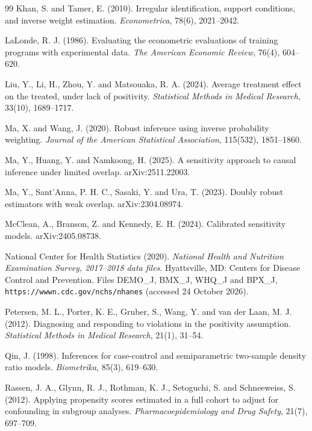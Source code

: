 \begin{thebibliography}{99}
 Khan, S. and Tamer, E. (2010). Irregular identification, support conditions, and inverse weight estimation. \emph{Econometrica}, 78(6), 2021--2042.

 LaLonde, R. J. (1986). Evaluating the econometric evaluations of training programs with experimental data. \emph{The American Economic Review}, 76(4), 604--620.

 Liu, Y., Li, H., Zhou, Y. and Matsouaka, R. A. (2024). Average treatment effect on the treated, under lack of positivity. \emph{Statistical Methods in Medical Research}, 33(10), 1689--1717.

 Ma, X. and Wang, J. (2020). Robust inference using inverse probability weighting. \emph{Journal of the American Statistical Association}, 115(532), 1851--1860.

 Ma, Y., Huang, Y. and Namkoong, H. (2025). A sensitivity approach to causal inference under limited overlap. arXiv:2511.22003.

 Ma, Y., Sant'Anna, P. H. C., Sasaki, Y. and Ura, T. (2023). Doubly robust estimators with weak overlap. arXiv:2304.08974.

 McClean, A., Branson, Z. and Kennedy, E. H. (2024). Calibrated sensitivity models. arXiv:2405.08738.

 National Center for Health Statistics (2020). \emph{National Health and Nutrition Examination Survey, 2017--2018 data files}. Hyattsville, MD: Centers for Disease Control and Prevention. Files DEMO\_J, BMX\_J, WHQ\_J and BPX\_J, \texttt{https://wwwn.cdc.gov/nchs/nhanes} (accessed 24 October 2026).

 Petersen, M. L., Porter, K. E., Gruber, S., Wang, Y. and van der Laan, M. J. (2012). Diagnosing and responding to violations in the positivity assumption. \emph{Statistical Methods in Medical Research}, 21(1), 31--54.

 Qin, J. (1998). Inferences for case-control and semiparametric two-sample density ratio models. \emph{Biometrika}, 85(3), 619--630.

 Rassen, J. A., Glynn, R. J., Rothman, K. J., Setoguchi, S. and Schneeweiss, S. (2012). Applying propensity scores estimated in a full cohort to adjust for confounding in subgroup analyses. \emph{Pharmacoepidemiology and Drug Safety}, 21(7), 697--709.


\end{thebibliography}
